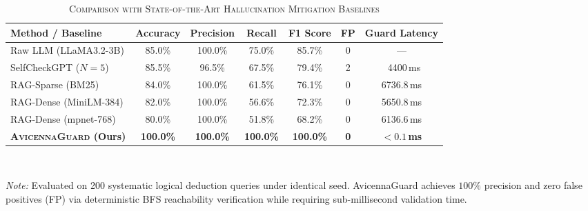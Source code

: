 \documentclass[journal]{IEEEtran}
\begin{document}
\begin{table}[t]
\centering
\caption{\textsc{Comparison with State-of-the-Art Hallucination Mitigation Baselines}}
\label{tab:baseline_comparison}
\begin{tabular}{lcccccc}
  \toprule
  \textbf{Method / Baseline} & \textbf{Accuracy} & \textbf{Precision} & \textbf{Recall} & \textbf{F1 Score} & \textbf{FP} & \textbf{Guard Latency} \\
  \midrule
  Raw LLM (LLaMA3.2-3B) & 85.0\% & 100.0\% & 75.0\% & 85.7\% & 0 & --- \\
  SelfCheckGPT ($N=5$) & 85.5\% & 96.5\% & 67.5\% & 79.4\% & 2 & ~4400\,ms \\
  RAG-Sparse (BM25) & 84.0\% & 100.0\% & 61.5\% & 76.1\% & 0 & 6736.8\,ms \\
  RAG-Dense (MiniLM-384) & 82.0\% & 100.0\% & 56.6\% & 72.3\% & 0 & 5650.8\,ms \\
  RAG-Dense (mpnet-768) & 80.0\% & 100.0\% & 51.8\% & 68.2\% & 0 & 6136.6\,ms \\
  \midrule
  \textbf{\textsc{AvicennaGuard} (Ours)} & \textbf{100.0\%} & \textbf{100.0\%} & \textbf{100.0\%} & \textbf{100.0\%} & \textbf{0} & \textbf{$< 0.1$\,ms} \\
  \bottomrule
\end{tabular}
\vspace{1mm}
\\[-1mm]
\raggedright
\footnotesize{\textit{Note:} Evaluated on 200 systematic logical deduction queries under identical seed. AvicennaGuard achieves $100\%$ precision and zero false positives (FP) via deterministic BFS reachability verification while requiring sub-millisecond validation time.}
\end{table}

\vspace{0.5cm}
\end{document}
